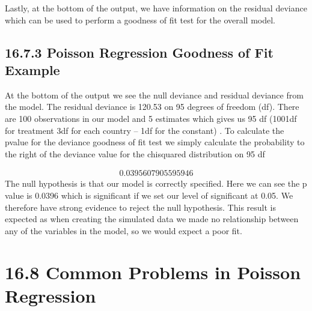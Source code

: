 \documentclass[letterpaper,10pt,english]{jupyterBook}
\begin{document}
\sphinxAtStartPar
Lastly, at the bottom of the output, we have information on the residual deviance which can be used to perform a goodness of fit test for the overall model.


\subsection{16.7.3 Poisson Regression Goodness of Fit Example}
\label{\detokenize{16.h. Generalised Linear Model (GLM):poisson-regression-goodness-of-fit-example}}
\sphinxAtStartPar
At the bottom of the output we see the null deviance and residual deviance from the model. The residual deviance is 120.53 on 95 degrees of freedom (df). There are 100 observations in our model and 5 estimates which gives us 95 df (100\sphinxhyphen{}1df for treatment\sphinxhyphen{} 3df for each country – 1df for the constant) . To calculate the p\sphinxhyphen{}value for the deviance goodness of fit test we simply calculate the probability to the right of the deviance value for the chi\sphinxhyphen{}squared distribution on 95 df

\begin{sphinxVerbatim}[commandchars=\\\{\}]
  
\end{sphinxVerbatim}
\begin{equation*}
\begin{split}0.0395607905595946\end{split}
\end{equation*}
\sphinxAtStartPar
The null hypothesis is that our model is correctly specified. Here we can see the p value is 0.0396 which is significant if we set our level of significant at 0.05. We therefore have strong evidence to reject the null hypothesis. This result is expected as when creating the simulated data we made no relationship between any of the variables in the model, so we would expect a poor fit.


\section{16.8 Common Problems in Poisson Regression}
\label{\detokenize{16.i. Generalised Linear Model (GLM):common-problems-in-poisson-regression}}\label{\detokenize{16.i. Generalised Linear Model (GLM)::doc}}
\end{document}
